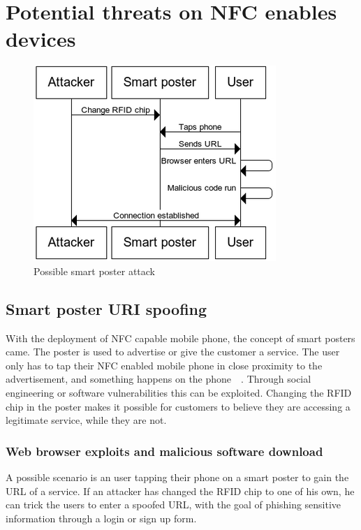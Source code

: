 \documentclass[a4paper,11pt]{article}
\begin{document}
\section{Potential threats on NFC enables devices}
\begin{figure}
  \centering
  \vspace{-2cm}
  \includegraphics[scale=0.6]{SD_SmartPoster1} %
  \vspace{-0.7cm}
  \caption{Possible smart poster attack
  \label{fig:SD_SmartPoster1}}
\end{figure}
\subsection{Smart poster URI spoofing}

With the deployment of NFC capable mobile phone, the concept of smart posters came.
The poster is used to advertise or give the customer a service. The user only has to tap their NFC enabled mobile phone in close proximity to the advertisement, and something happens on the phone~\cite{ruiz2009university}~\cite{smartposter}. Through social engineering or software vulnerabilities this can be exploited. Changing the RFID chip in the poster makes it possible for customers to believe they are accessing a legitimate service, while they are not. 

\subsubsection{Web browser exploits and malicious software download}

A possible scenario is an user tapping their phone on a smart poster to gain the URL of a service. If an attacker has changed the RFID chip to one of his own, he can trick the users to enter a spoofed URL, with the goal of phishing sensitive information through a login or sign up form. 
\end{document}
